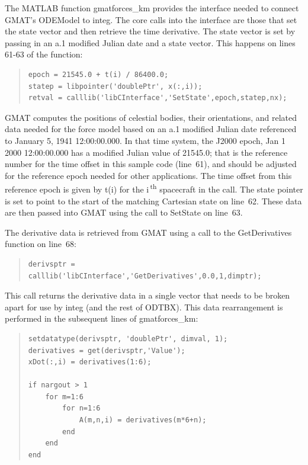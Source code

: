 \documentclass[letterpaper,10pt]{article}
\begin{document}
The MATLAB function gmatforces\_km provides the interface needed to connect GMAT's ODEModel to integ.  The core calls into the interface are those that set the state vector and then retrieve the time derivative.  The state vector is set by passing in an a.1 modified Julian date and a state vector.  This happens on lines 61-63 of the function:

\begin{quote}
\lstset{language=Matlab, numbers=left, numberstyle=\tiny}
\begin{lstlisting}[firstnumber=61]
epoch = 21545.0 + t(i) / 86400.0;
statep = libpointer('doublePtr', x(:,i));
retval = calllib('libCInterface','SetState',epoch,statep,nx);
\end{lstlisting}
\end{quote}

\noindent GMAT computes the positions of celestial bodies, their orientations, and related data needed for the force model based on an a.1 modified Julian date referenced to January 5, 1941 12:00:00.000.  In that time system, the J2000 epoch, Jan 1 2000 12:00:00.000 has a modified Julian value of 21545.0; that is the reference number for the time offset in this sample code (line~61), and should be adjusted for the reference epoch needed for other applications.  The time offset from this reference epoch is given by t(i) for the i\,\textsuperscript{th} spacecraft in the call.  The state pointer is set to point to the start of the matching Cartesian state on line~62.  These data are then passed into GMAT using the call to SetState on line~63.

The derivative data is retrieved from GMAT using a call to the GetDerivatives function on line~68:
    
\begin{quote}
\lstset{language=Matlab, numbers=left, numberstyle=\tiny}
\begin{lstlisting}[firstnumber=68]
derivsptr = calllib('libCInterface','GetDerivatives',0.0,1,dimptr);
\end{lstlisting}
\end{quote}

\noindent This call returns the derivative data in a single vector that needs to be broken apart for use by integ (and the rest of ODTBX).  This data rearrangement is performed in the subsequent lines of gmatforces\_km:

\begin{quote}
\lstset{language=Matlab, numbers=left, numberstyle=\tiny}
\begin{lstlisting}[firstnumber=77]
setdatatype(derivsptr, 'doublePtr', dimval, 1);
derivatives = get(derivsptr,'Value');
xDot(:,i) = derivatives(1:6);

if nargout > 1
    for m=1:6
        for n=1:6
            A(m,n,i) = derivatives(m*6+n);
        end
    end
end
\end{lstlisting}
\end{quote}
\end{document}
